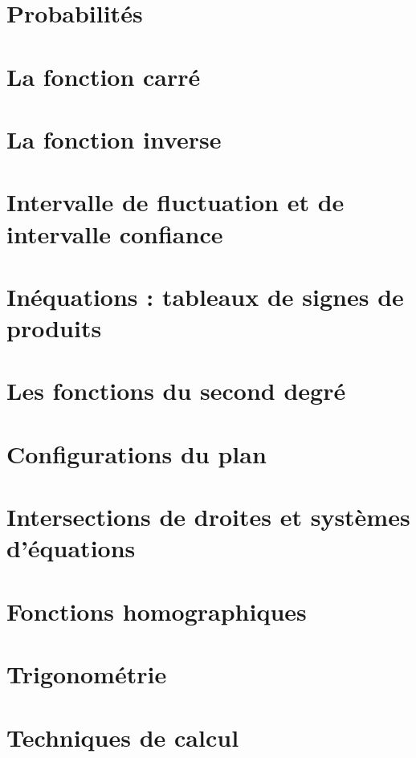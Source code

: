 \documentclass[a4paper,12pt]{book}
\begin{document}
\chapter{Probabilités}


\chapter{La fonction carré}


\chapter{La fonction inverse}


\chapter{Intervalle de fluctuation et de intervalle confiance}


\chapter{Inéquations : tableaux de signes de produits}


\chapter{Les fonctions du second degré}


\chapter{Configurations du plan}


\chapter{Intersections de droites et systèmes d'équations}


\chapter{Fonctions homographiques}


\chapter{Trigonométrie}


\chapter{Techniques de calcul}

\end{document}
